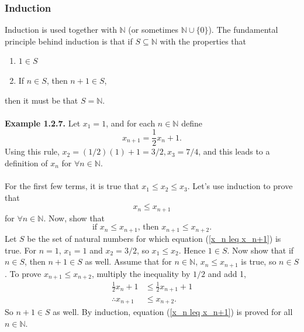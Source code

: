 \documentclass{article}
\begin{document}
    \subsubsection{Induction}
        Induction is used together with $\mathbb{N}$ (or sometimes $\mathbb{N} \cup \{0\}$). The fundamental principle behind induction is that if $S \subseteq \mathbb{N}$ with the properties that
        \begin{enumerate}
            \item $1 \in S$
            \item If $n \in S$, then $n+1 \in S$,
        \end{enumerate}
        then it must be that $S = \mathbb{N}$.\\ \\
        \textbf{Example 1.2.7.} Let $x_1 = 1$, and for each $n \in \mathbb{N}$ define
        \begin{equation*}
            x_{n+1} = \frac{1}{2}x_n + 1.
        \end{equation*}
        Using this rule, $x_2 = (1/2)(1)+1 = 3/2, x_3 = 7/4$, and this leads to a definition of $x_n$ for $\forall n \in \mathbb{N}$. \\ \\
        For the first few terms, it is true that $x_1 \leq x_2 \leq x_3$. Let's use induction to prove that 
        \begin{equation}
            x_n \leq x_{n+1}
            \label{x_n leq x_n+1}
        \end{equation}
        for $\forall n \in \mathbb{N}$. Now, show that
        \begin{equation*}
            \text{if $x_n \leq x_{n+1}$, then $x_{n+1} \leq x_{n+2}$.}
        \end{equation*}
        Let $S$ be the set of natural numbers for which equation (\ref{x_n leq x_n+1}) is true. For $n=1$, $x_1 = 1$ and $x_2 = 3/2$, so $x_1 \leq x_2$. Hence $1 \in S$. Now show that if $n \in S$, then $n+1 \in S$ as well. Assume that for $n \in \mathbb{N}$, $x_n \leq x_{n+1}$ is true, so $n \in S$. To prove $x_{n+1} \leq x_{n+2}$, multiply the inequality by $1/2$ and add 1,
        \begin{align*}
             \frac{1}{2}x_n + 1 & \leq \frac{1}{2}x_{n+1} + 1 \\
            \therefore x_{n+1} & \leq x_{n+2}.
        \end{align*}
        So $n+1 \in S$ as well. By induction, equation (\ref{x_n leq x_n+1}) is proved for all $n \in \mathbb{N}$.
    
\end{document}
